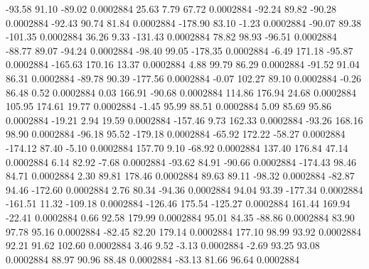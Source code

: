       -93.58       91.10      -89.02     0.0002884
       25.63        7.79       67.72     0.0002884
      -92.24       89.82      -90.28     0.0002884
      -92.43       90.74       81.84     0.0002884
     -178.90       83.10       -1.23     0.0002884
      -90.07       89.38     -101.35     0.0002884
       36.26        9.33     -131.43     0.0002884
       78.82       98.93      -96.51     0.0002884
      -88.77       89.07      -94.24     0.0002884
      -98.40       99.05     -178.35     0.0002884
       -6.49      171.18      -95.87     0.0002884
     -165.63      170.16       13.37     0.0002884
        4.88       99.79       86.29     0.0002884
      -91.52       91.04       86.31     0.0002884
      -89.78       90.39     -177.56     0.0002884
       -0.07      102.27       89.10     0.0002884
       -0.26       86.48        0.52     0.0002884
        0.03      166.91      -90.68     0.0002884
      114.86      176.94       24.68     0.0002884
      105.95      174.61       19.77     0.0002884
       -1.45       95.99       88.51     0.0002884
        5.09       85.69       95.86     0.0002884
      -19.21        2.94       19.59     0.0002884
     -157.46        9.73      162.33     0.0002884
      -93.26      168.16       98.90     0.0002884
      -96.18       95.52     -179.18     0.0002884
      -65.92      172.22      -58.27     0.0002884
     -174.12       87.40       -5.10     0.0002884
      157.70        9.10      -68.92     0.0002884
      137.40      176.84       47.14     0.0002884
        6.14       82.92       -7.68     0.0002884
      -93.62       84.91      -90.66     0.0002884
     -174.43       98.46       84.71     0.0002884
        2.30       89.81      178.46     0.0002884
       89.63       89.11      -98.32     0.0002884
      -82.87       94.46     -172.60     0.0002884
        2.76       80.34      -94.36     0.0002884
       94.04       93.39     -177.34     0.0002884
     -161.51       11.32     -109.18     0.0002884
     -126.46      175.54     -125.27     0.0002884
      161.44      169.94      -22.41     0.0002884
        0.66       92.58      179.99     0.0002884
       95.01       84.35      -88.86     0.0002884
       83.90       97.78       95.16     0.0002884
      -82.45       82.20      179.14     0.0002884
      177.10       98.99       93.92     0.0002884
       92.21       91.62      102.60     0.0002884
        3.46        9.52       -3.13     0.0002884
       -2.69       93.25       93.08     0.0002884
       88.97       90.96       88.48     0.0002884
      -83.13       81.66       96.64     0.0002884
